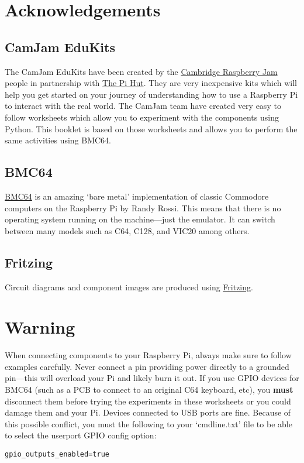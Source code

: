 \begin{titlepage}
\section*{Acknowledgements}

\subsection*{CamJam EduKits}


The CamJam EduKits have been created by the \href{https://camjam.me/}{Cambridge Raspberry Jam} people in partnership with \href{https://thepihut.com/collections/camjam-edukit}{The Pi Hut}.  They are very inexpensive kits which will help you get started on your journey of understanding how to use a Raspberry Pi to interact with the real world.  The CamJam team have created very easy to follow worksheets which allow you to experiment with the components using Python.  This booklet is based on those worksheets and allows you to perform the same activities using BMC64.

\subsection*{BMC64}

\href{https://github.com/randyrossi/bmc64}{BMC64} is an amazing `bare metal' implementation of classic Commodore computers on the Raspberry Pi by Randy Rossi.  This means that there is no operating system running on the machine---just the emulator.  It can switch between many models such as C64, C128, and VIC20 among others.

\subsection*{Fritzing}

Circuit diagrams and component images are produced using \href{https://fritzing.org/}{Fritzing}.
\vfill
\section*{\color{red}Warning}

When connecting components to your Raspberry Pi, always make sure to follow examples carefully.  Never connect a pin providing power directly to a grounded pin---this will overload your Pi and likely burn it out.  If you use GPIO devices for BMC64 (such as a PCB to connect to an original C64 keyboard, etc), you \textbf{must} disconnect them before trying the experiments in these worksheets or you could damage them and your Pi.  Devices connected to USB ports are fine.  Because of this possible conflict, you must the following to your `cmdline.txt' file to be able to select the userport GPIO config option:
\begin{verbatim}
gpio_outputs_enabled=true
\end{verbatim}

\end{titlepage}

